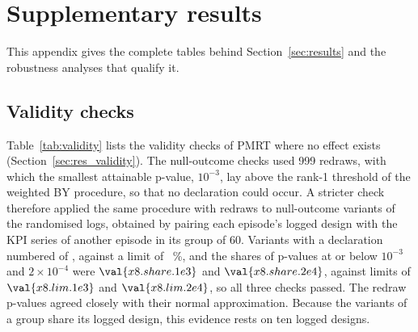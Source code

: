 \FloatBarrier
\section{Supplementary results}
\label{app:posthoc}
\label{app:x9x10}

This appendix gives the complete tables behind Section~\ref{sec:results} and the robustness analyses that qualify it.

\subsection{Validity checks}
\label{app:validity}
\label{app:x8}

Table~\ref{tab:validity} lists the validity checks of PMRT where no effect exists (Section~\ref{sec:res_validity}). The
null-outcome checks used 999 redraws, with which the smallest attainable p-value, $10^{-3}$, lay above the rank-1
threshold of the weighted BY procedure, so that no declaration could occur. A stricter check therefore applied the same
procedure with  redraws to  null-outcome variants of the randomised logs, obtained by pairing each episode's
logged design with the KPI series of another episode in its group of 60. Variants with a declaration numbered  of ,
against a limit of ~\%, and the shares of p-values at or below $10^{-3}$ and $2 \times 10^{-4}$ were $\val{x8.share.1e3}$ and $\val{x8.share.2e4}$, against limits of $\val{x8.lim.1e3}$ and $\val{x8.lim.2e4}$, so all three checks
passed. The redraw p-values agreed closely with their normal approximation. Because the variants of a
group share its logged design, this evidence rests on ten logged designs.

